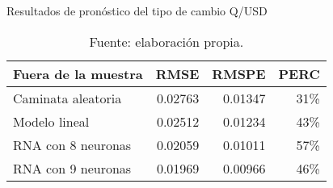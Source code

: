 \begin{table}[htbp]
  \centering
  \caption{Resultados de pronóstico del tipo de cambio Q/USD}
    \begin{tabular}{lrrr}
    \toprule
    \multicolumn{1}{c}{\textbf{Fuera de la muestra}} & \multicolumn{1}{c}{\textbf{RMSE}} & \multicolumn{1}{c}{\textbf{RMSPE}} & \multicolumn{1}{c}{\textbf{PERC}} \\
    \midrule
    Caminata aleatoria    & 0.02763 & 0.01347 & 31\% \\
    Modelo lineal & 0.02512 & 0.01234 & 43\% \\
    RNA con 8 neuronas & 0.02059 & 0.01011 & 57\% \\
    RNA con 9 neuronas & 0.01969 & 0.00966 & 46\% \\
    \bottomrule
    \end{tabular}%
    \caption*{Fuente: elaboración propia.}
  \label{tab:resOutOfSample}%
\end{table}%
